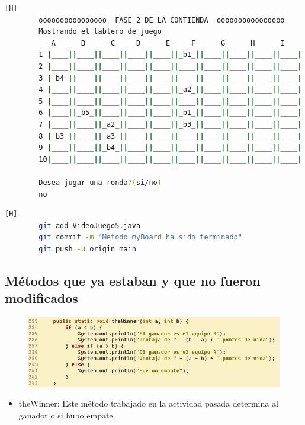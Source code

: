 \documentclass{article}
\begin{document}
\begin{lstlisting}[language=bash,caption={Compilando y probando el codigo }][H]
		oooooooooooooooo  FASE 2 DE LA CONTIENDA  oooooooooooooooo
		Mostrando el tablero de juego
		   A      B      C     D      E     F      G      H      I      J
		1 |____||____||____||____||____||_b1_||____||____||____||____|
		2 |____||____||____||____||____||____||____||____||____||____|
		3 |_b4_||____||____||____||____||____||____||____||____||____|
		4 |____||____||____||____||____||_a2_||____||____||____||____|
		5 |____||____||____||____||____||____||____||____||____||____|
		6 |____||_b5_||____||____||____||_b1_||____||____||____||____|
		7 |____||____||_a2_||____||____||_b3_||____||____||____||____|
		8 |_b3_||____||_a3_||____||____||____||____||____||____||____|
		9 |____||____||_b4_||____||____||____||____||____||____||____|
		10|____||____||____||____||____||____||____||____||____||____|
		
		Desea jugar una ronda?(si/no)
		no
	\end{lstlisting}
	
	
	\begin{lstlisting}[language=bash,caption={Commit: 6a85e033318ba91b893414da2a57263477c07c71}][H]
		git add VideoJuego5.java
		git commit -m "Metodo myBoard ha sido terminado"			
		git push -u origin main
	\end{lstlisting}
	
		
	\subsection{Métodos que ya estaban y que no fueron modificados}
	
	\begin{figure}[H]
		\centering
		\includegraphics[width=1\textwidth,keepaspectratio]{img/theWinner.jpg}
	\end{figure}
	
	
	\begin{itemize}	
		\item theWinner: Este método trabajado en la actividad pasada determina al ganador o si hubo empate.
	\end{itemize}
	
\end{document}
